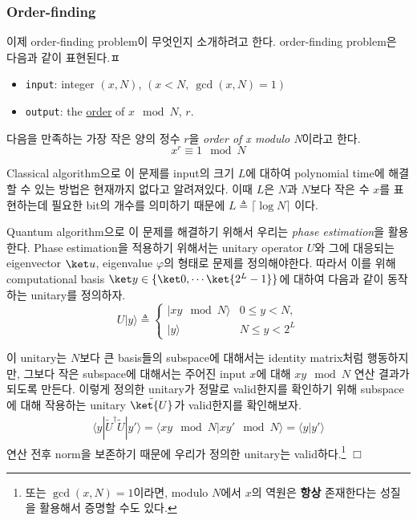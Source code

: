 \subsubsection{Order-finding}\label{sec:order-finding}
이제 order-finding problem이 무엇인지 소개하려고 한다. order-finding problem은 다음과 같이 표현된다.ㅍ
\begin{itemize}
  \item \texttt{input}: integer $(x, N)$, $(x < N, \ \gcd(x, N) = 1)$
  \item \texttt{output}: the \hyperref[def:order]{order} of $x \mod N$, $r$.
\end{itemize}

\begin{definition}[Order]\label{def:order}
  다음을 만족하는 가장 작은 양의 정수 $r$을 \textit{order of x modulo N}이라고 한다.
  $$x^r \equiv 1 \mod N$$ 
\end{definition}

Classical algorithm으로 이 문제를 input의 크기 $L$에 대하여 polynomial time에 해결할 수 있는 방법은 현재까지 없다고 알려져있다. 이때 $L$은 $N$과 $N$보다 작은 수 $x$를 표현하는데 필요한 bit의 개수를 의미하기 때문에 $L \triangleq \lceil \log N \rceil$ 이다.

\vspace{1em}

Quantum algorithm으로 이 문제를 해결하기 위해서 우리는 \textit{phase estimation}을 활용한다. Phase estimation을 적용하기 위해서는 unitary operator $U$와 그에 대응되는 eigenvector $\ket u$, eigenvalue $\varphi$의 형태로 문제를 정의해야한다. 
따라서 이를 위해 computational basis $\ket y \in \{\ket 0, \cdots \ket{2^L-1}\}$에 대하여 다음과 같이 동작하는 unitary를 정의하자. 
\begin{equation*}
  U|y\rangle \triangleq \begin{cases}|x y \mod N\rangle & 0 \leq y<N, \\ |y\rangle & N \leq y<2^L\end{cases}
\end{equation*}

이 unitary는 $N$보다 큰 basis들의 subspace에 대해서는 identity matrix처럼 행동하지만, 그보다 작은 subspace에 대해서는 주어진 input $x$에 대해 $xy \mod N$ 연산 결과가 되도록 만든다.
이렇게 정의한 unitary가 정말로 valid한지를 확인하기 위해 subspace에 대해 작용하는 unitary $\tilde{\ket{U}}$가 valid한지를 확인해보자.
\begin{align*}
  \langle y| \tilde U^\dagger \tilde U |y'\rangle = \langle xy \mod N| xy' \mod N\rangle = \langle y|y'\rangle 
\end{align*}
연산 전후 norm을 보존하기 때문에 우리가 정의한 unitary는 valid하다.\footnote{또는 $\gcd(x, N) = 1$이라면, modulo $N$에서 $x$의 역원은 \textbf{항상} 존재한다는 성질을 활용해서 증명할 수도 있다.} $\Box$

